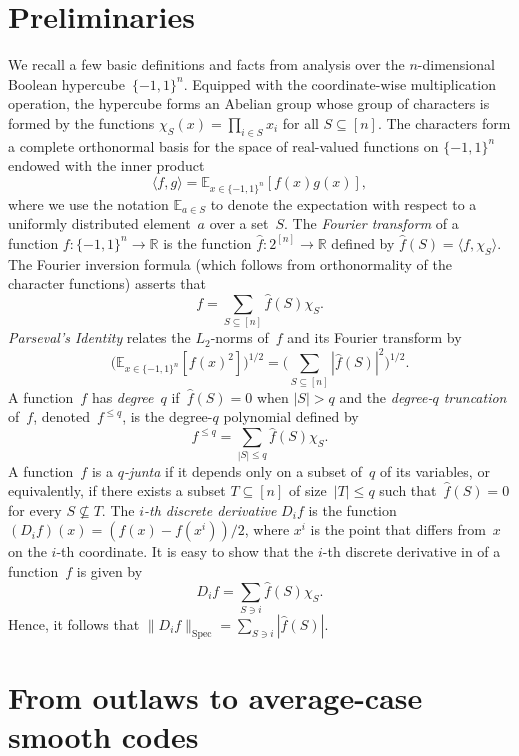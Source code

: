 \documentclass[11pt]{article}
\numberwithin{equation}{section}
\theoremstyle{definition}
\theoremstyle{plain}
\newcommand{\R}{\mathbb R}
\newcommand{\pmset}[1]{\{-1,1\}^{#1}} %
\newcommand{\Exp}{{\mathbb{E}}}
\DeclareMathOperator{\spec}{Spec}
\newcommand{\beqn}{\begin{equation*}}
\newcommand{\eeqn}{\end{equation*}}
\begin{document}
%

\section{Preliminaries}
\label{sec:prelims}

We recall a few basic definitions and facts from  analysis over the $n$-dimensional Boolean hypercube~$\pmset{n}$.
Equipped with the coordinate-wise multiplication operation, the hypercube forms an Abelian group whose group of characters is formed by the functions $\chi_S(x) = \prod_{i\in S}x_i$ for all  $S\subseteq[n]$.
The characters form a complete orthonormal basis for the space of real-valued functions on $\pmset{n}$ endowed with the inner product
\[
  \langle f,g\rangle = \Exp_{x\in\pmset{n}}[f(x)g(x)],
\]
where we use the notation $\Exp_{a\in S}$ to denote the expectation with respect to a uniformly distributed element~$a$ over a set~$S$.
The \emph{Fourier transform} of a function $f:\pmset{n}\to\R$ is the function $\widehat f:2^{[n]}\to \R$ defined by $\widehat{f}(S) = \langle f,\chi_S\rangle$.
The Fourier inversion formula (which follows from orthonormality of the character functions) asserts that
\beqn
f = \sum_{S\subseteq [n]} \widehat{f}(S)\chi_S.
\eeqn
\emph{Parseval's Identity} relates the $L_2$-norms of~$f$ and its Fourier transform by
\beqn
\big(\Exp_{x\in\pmset{n}}[f(x)^2]\big)^{1/2}
=
\Big(\sum_{S\subseteq [n]}|\widehat{f}(S)|^2\Big)^{1/2}.
\eeqn
A function~$f$ has \emph{degree}~$q$ if~$\widehat{f}(S) = 0$ when $|S| > q$ and
the \emph{degree-$q$ truncation} of~$f$, denoted~$f^{\le q}$, is the degree-$q$ polynomial defined by
\beqn
f^{\le q}=\sum_{|S|\le q}\widehat{f}(S)\chi_S.
\eeqn 
A function~$f$ is a \emph{$q$-junta} if it depends only on a subset of~$q$ of its variables, or equivalently, if there exists a subset $T\subseteq [n]$ of size~$|T|\leq q$ such that~$\widehat{f}(S) = 0$ for every $S\not\subseteq T$. The \emph{$i$-th %
discrete derivative} $D_if$ is the function $(D_if)(x) = (f(x) - f(x^i))/2$, where $x^i$ is the point that differs from~$x$ on the $i$-th %
coordinate.
It is easy to show that the $i$-th %
discrete derivative in of a function~$f$ is given by
\beqn
D_if = \sum_{S\ni i} \widehat{f}(S) \chi_S.
\eeqn
Hence, it follows that $\|D_if\|_{\spec} = \sum_{S\ni i}|\widehat f(S)|$.

%
\section{From outlaws to average-case smooth codes}
\label{sec:outlaw2smoothcode}
\end{document}
